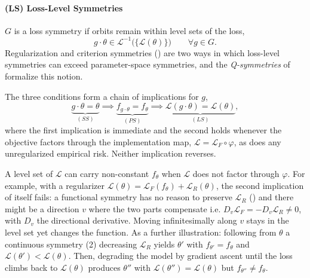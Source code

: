 \documentclass[mathematics,review,submit,moreauthors]{Definitions/mdpi}
\begin{document}
\paragraph{(LS) Loss-Level Symmetries} $G$ is a loss symmetry if orbits remain within level sets of the loss,
\begin{equation*}
    g\cdot\theta \in \mathcal{L}^{-1}\big(\{\mathcal{L}(\theta)\}\big) \qquad \forall g \in G.
\end{equation*} 
Regularization and criterion symmetries () are two ways in which loss-level symmetries can exceed parameter-space symmetries, and the \emph{Q-symmetries} of \citet{ziyin2024a} formalize this notion.

The three conditions form a chain of implications for $g$,
\begin{equation}\label{eq:param-symmetry-hierarchy}
    \underbrace{g\cdot\theta=\theta}_{(SS)} \implies \underbrace{f_{g\cdot\theta}=f_\theta}_{(PS)} \implies \underbrace{\mathcal{L}(g\cdot\theta)=\mathcal{L}(\theta)}_{(LS)},
\end{equation}
where the first implication is immediate and the second holds whenever the objective factors through the implementation map, $\mathcal{L}=\mathcal{L}_F\circ\varphi$, as does any unregularized empirical risk.
Neither implication reverses.

\begin{Example}\label{ex:loss-level-symmetry-regularization}
    A level set of $\mathcal{L}$ can carry non-constant $f_\theta$ when $\mathcal{L}$ does not factor through $\varphi$.
    For example, with a regularizer $\mathcal{L}(\theta)=\mathcal{L}_F(f_\theta)+\mathcal{L}_R(\theta)$, the second implication of  itself fails: a functional symmetry has no reason to preserve $\mathcal{L}_R$ () and there might be a direction $v$ where the two parts compensate i.e. $D_v\mathcal{L}_F=-D_v\mathcal{L}_R\neq 0$, with $D_v$ the directional derivative.
    Moving infinitesimally along $v$ stays in the level set yet changes the function.
    As a further illustration: following from $\theta$ a continuous symmetry (2) decreasing $\mathcal{L}_R$ yields $\theta'$ with $f_{\theta'}=f_\theta$ and $\mathcal{L}(\theta')<\mathcal{L}(\theta)$.
    Then, degrading the model by gradient ascent until the loss climbs back to $\mathcal{L}(\theta)$ produces $\theta''$ with $\mathcal{L}(\theta'')=\mathcal{L}(\theta)$ but $f_{\theta''}\neq f_\theta$.
\end{Example}
\end{document}
